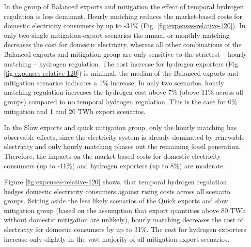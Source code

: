 In the group of Balanced exports and \co mitigation the effect of temporal hydrogen regulation is less dominant.
Hourly matching reduces the market-based costs for domestic electricity consumers by up to -31\% (Fig. \ref{fig:expenses-relative-120}). In only two single mitigation-export scenarios the annual or monthly matching decreases the cost for domestic electricity, whereas all other combinations of the Balanced exports and \co mitigation group are only sensitive to the strictest -- hourly matching -- hydrogen regulation. 
The cost increase for hydrogen exporters (Fig. \ref{fig:expenses-relative-120}) is minimal, the median of the Balanced exports and \co mitigation scenarios indicates a 1\% increase.
In only two scenarios, hourly matching regulation increases the hydrogen cost above 7\% (above 11\% across all groups) compared to no temporal hydrogen regulation. This is the case for 0\% \co mitigation and 1 and 20 TWh export scenarios. 

In the Slow exports and quick \co mitigation group, only the hourly matching has observable effects, since the electricity system is already dominated by renewable electricity and only hourly matching phases out the remaining fossil generation. Therefore, the impacts on the market-based costs for domestic electricity consumers (up to -11\%) and hydrogen exporters (up to 8\%) are moderate.

Figure \ref{fig:expenses-relative-120} shows, that temporal hydrogen regulation hedges domestic electricity consumers against rising costs across all scenario groups.
Setting aside the less likely scenarios of the Quick exports and slow \co mitigation group (based on the assumption that export quantities above 80 TWh without domestic \co mitigation are unlikely), hourly matching decreases the cost of electricity for domestic consumers by up to 31\%. The cost for hydrogen exporters increase only slightly in the vast majority of all mitigation-export scenarios.
